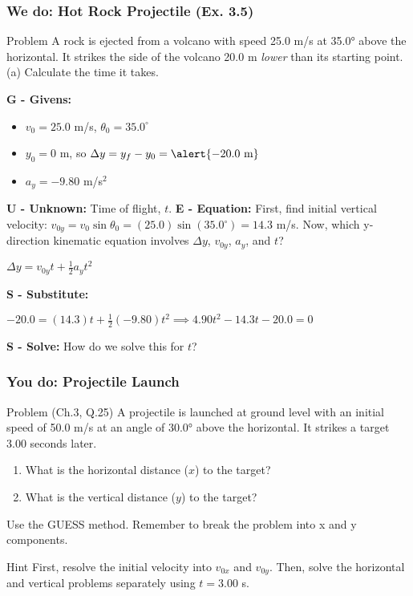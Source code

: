 \documentclass{beamer}
\begin{document}
\begin{frame}
\frametitle{We do: Hot Rock Projectile (Ex. 3.5)}
\begin{block}{Problem}
A rock is ejected from a volcano with speed 25.0 m/s at 35.0° above the horizontal. It strikes the side of the volcano 20.0 m \textit{lower} than its starting point. (a) Calculate the time it takes.
\end{block}
\textbf{G - Givens:}
\begin{itemize}
    \item $v_0 = 25.0$ m/s, $\theta_0 = 35.0^\circ$
    \item $y_0 = 0$ m, so $\Delta y = y_f - y_0 = \alert{-20.0 \text{ m}}$
    \item $a_y = -9.80$ m/s$^2$
\end{itemize}
\pause
\textbf{U - Unknown:} Time of flight, $t$.
\pause
\textbf{E - Equation:}
First, find initial vertical velocity: $v_{0y} = v_0 \sin\theta_0 = (25.0)\sin(35.0^\circ) = 14.3$ m/s.
\vfill
Now, which y-direction kinematic equation involves $\Delta y$, $v_{0y}$, $a_y$, and $t$?
\begin{center}\alert{$\Delta y = v_{0y}t + \frac{1}{2}a_y t^2$}\end{center}
\pause
\textbf{S - Substitute:}
\begin{center} $-20.0 = (14.3)t + \frac{1}{2}(-9.80)t^2 \implies 4.90t^2 - 14.3t - 20.0 = 0$ \end{center}
\textbf{S - Solve:} How do we solve this for $t$?
\end{frame}

\begin{frame}
\frametitle{You do: Projectile Launch}
\begin{block}{Problem (Ch.3, Q.25)}
A projectile is launched at ground level with an initial speed of 50.0 m/s at an angle of 30.0° above the horizontal. It strikes a target 3.00 seconds later.
\begin{enumerate}
    \item What is the horizontal distance ($x$) to the target?
    \item What is the vertical distance ($y$) to the target?
\end{enumerate}
\end{block}
\vfill
\begin{center}
Use the GUESS method. Remember to break the problem into x and y components.
\end{center}
\vfill
\begin{alertblock}{Hint}
First, resolve the initial velocity into $v_{0x}$ and $v_{0y}$. Then, solve the horizontal and vertical problems separately using $t = 3.00$ s.
\end{alertblock}
\end{frame}
\end{document}

